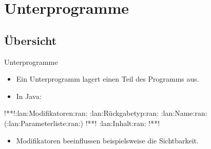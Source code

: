 \section{Unterprogramme}
\subsection{Übersicht}
\begin{frame}[fragile,c]{Unterprogramme}
   \begin{itemize}[<+(1)->]
      \itemsep11pt
      \item Ein Unterprogramm lagert einen Teil des Programms aus.
      \item In Java: \vspace*{-8\baselineskip}
   \end{itemize}
\begin{layout-imageonly}
\begin{plainjava}
!**!:lan:Modifikatoren:ran: :lan:Rückgabetyp:ran: :lan:Name:ran:(:lan:Parameterliste:ran:) {
!**!   :lan:Inhalt:ran:
!**!}
\end{plainjava}\vspace*{-9\baselineskip}
\end{layout-imageonly}
   \begin{itemize}[<+(1)->]
      \itemsep11pt
      \item<5-> Modifikatoren beeinflussen beispielsweise die Sichtbarkeit.
   \end{itemize}
\end{frame}

